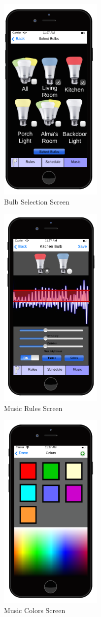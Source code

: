 \documentclass[12pt]{article}
\begin{document}
  \begin{figure}[ht!]
    \centering
    \includegraphics[width=50mm]{iPhone_music_select_bulb.png}
    \caption{Bulb Selection Screen}
    \label{fig:bulbSelectionScreen}
  \end{figure}
  
  \begin{figure}[ht!]
    \centering
    \includegraphics[width=50mm]{iPhone_music_main.png}
    \caption{Music Rules Screen}
    \label{fig:musicRules}
  \end{figure}
  
  \begin{figure}[ht!]
    \centering
    \includegraphics[width=50mm]{iPhone_music_color.png}
    \caption{Music Colors Screen}
    \label{fig:musicColors}
  \end{figure}
\end{document}
